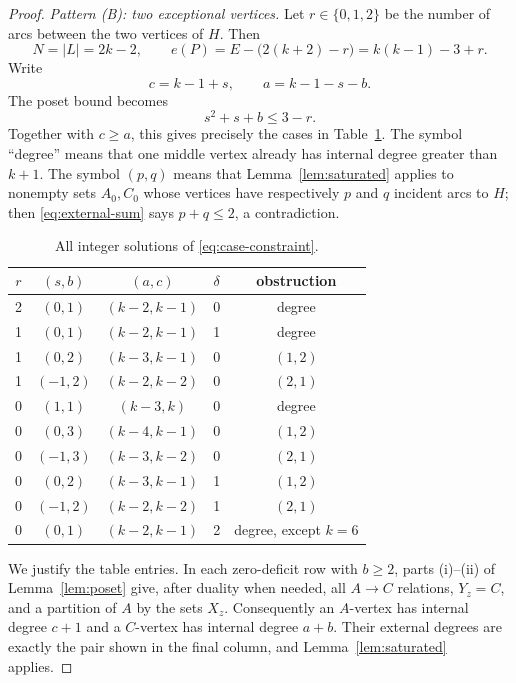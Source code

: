 \documentclass[11pt]{amsart}
\theoremstyle{definition}
\begin{document}
\begin{proof}
\smallskip
\noindent\emph{Pattern (B): two exceptional vertices.}
Let $r\in\{0,1,2\}$ be the number of arcs between the two vertices of $H$.
Then
\[
 N=|L|=2k-2,
 \qquad
 e(P)=E-\bigl(2(k+2)-r\bigr)=k(k-1)-3+r.
\]
Write
\[
 c=k-1+s,
 \qquad a=k-1-s-b.
\]
The poset bound becomes
\begin{equation}\label{eq:case-constraint}
 s^2+s+b\le3-r.
\end{equation}
Together with $c\ge a$, this gives precisely the cases in
Table~\ref{tab:cases}.  The symbol ``degree'' means that one middle vertex
already has internal degree greater than $k+1$.  The symbol
$(p,q)$ means that Lemma~\ref{lem:saturated} applies to nonempty sets
$A_0,C_0$ whose vertices have respectively $p$ and $q$ incident arcs to
$H$; then \eqref{eq:external-sum} says $p+q\le2$, a contradiction.

\begin{table}[ht]
\centering
\begin{tabular}{c c c c c}
\toprule
$r$ & $(s,b)$ & $(a,c)$ & $\delta$ & obstruction \\
\midrule
2 & $(0,1)$  & $(k-2,k-1)$ & 0 & degree \\
\midrule
1 & $(0,1)$  & $(k-2,k-1)$ & 1 & degree \\
1 & $(0,2)$  & $(k-3,k-1)$ & 0 & $(1,2)$ \\
1 & $(-1,2)$ & $(k-2,k-2)$ & 0 & $(2,1)$ \\
\midrule
0 & $(1,1)$  & $(k-3,k)$   & 0 & degree \\
0 & $(0,3)$  & $(k-4,k-1)$ & 0 & $(1,2)$ \\
0 & $(-1,3)$ & $(k-3,k-2)$ & 0 & $(2,1)$ \\
0 & $(0,2)$  & $(k-3,k-1)$ & 1 & $(1,2)$ \\
0 & $(-1,2)$ & $(k-2,k-2)$ & 1 & $(2,1)$ \\
0 & $(0,1)$  & $(k-2,k-1)$ & 2 & degree, except $k=6$ \\
\bottomrule
\end{tabular}
\caption{All integer solutions of \eqref{eq:case-constraint}.}
\label{tab:cases}
\end{table}

We justify the table entries.  In each zero-deficit row with $b\ge2$,
parts (i)--(ii) of Lemma~\ref{lem:poset} give, after duality when needed,
all $A\to C$ relations, $Y_z=C$, and a partition of $A$ by the sets $X_z$.
Consequently an $A$-vertex has internal degree $c+1$ and a $C$-vertex has
internal degree $a+b$.  Their external degrees are exactly the pair shown
in the final column, and Lemma~\ref{lem:saturated} applies.


\end{proof}
\end{document}
